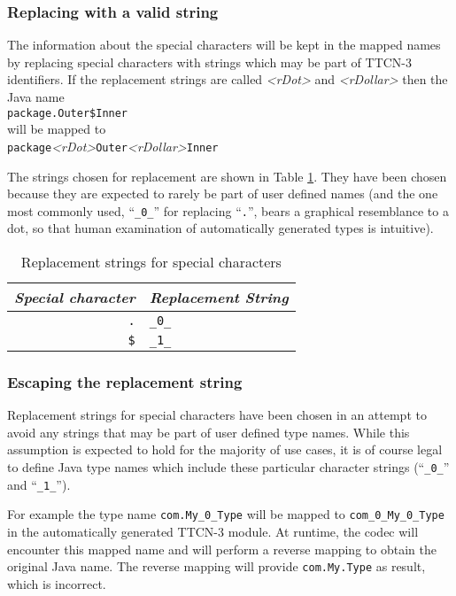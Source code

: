 \subsubsection{Replacing with a valid string}

The information about the special characters will be kept in the mapped names
by replacing special characters with strings
which may be part of \ac{TTCN-3} identifiers.
If the replacement strings are called \emph{<rDot>} and \emph{<rDollar>}
then the Java name\\
\verb=package.Outer$Inner=\\
will be mapped to\\
\verb=package=\emph{<rDot>}\verb=Outer=\emph{<rDollar>}\verb=Inner=

The strings chosen for replacement are shown in
Table \ref{tab:replacement-strings}.
They have been chosen because
they are expected to rarely be part of user defined names
(and the one most commonly used, ``\verb=_0_='' for replacing ``\verb=.='',
bears a graphical resemblance to a dot,
so that human examination of automatically generated types is intuitive).

\begin{table}[htb]
\centering
\begin{tabular}{|r || l|}
	\hline
	\emph{Special character} & \emph{Replacement String} \\
	\hline
	\verb=.= & \verb=_0_= \\
	\verb=$= & \verb=_1_= \\
	\hline
\end{tabular}
\caption{Replacement strings for special characters%
	\label{tab:replacement-strings}}
\end{table}


\subsubsection{Escaping the replacement string}

Replacement strings for special characters have been chosen
in an attempt to avoid any strings that may be part of user defined type names.
While this assumption is expected to hold for the majority of use cases,
it is of course legal to define Java type names which include
these particular character strings (``\verb=_0_='' and ``\verb=_1_='').

For example the type name \verb=com.My_0_Type=
will be mapped to \verb=com_0_My_0_Type= in the automatically generated
\ac{TTCN-3} module.
At runtime, the codec will encounter this mapped name
and will perform a reverse mapping to obtain the original Java name.
The reverse mapping will provide \verb=com.My.Type= as result,
which is incorrect.

